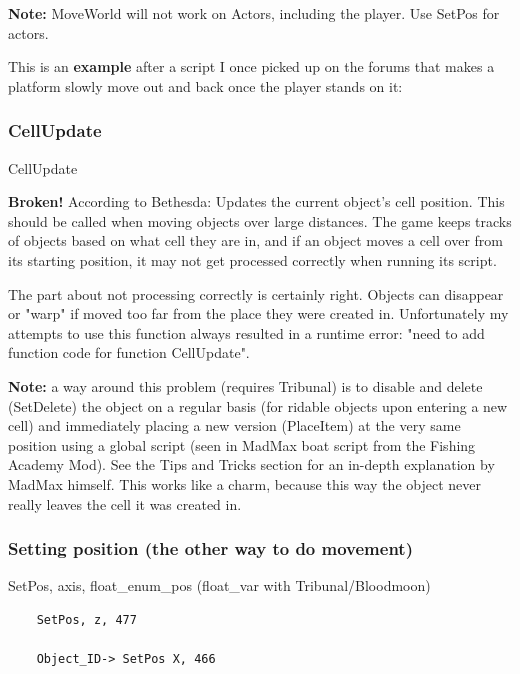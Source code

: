 \textbf{Note:} MoveWorld will not work on Actors, including the player.
Use SetPos for actors.

This is an \textbf{example} after a script I once picked up on the
forums that makes a platform slowly move out and back once the player
stands on it:



\hypertarget{cellupdate}{%
\subsubsection{CellUpdate}\label{cellupdate}}

CellUpdate

\textbf{Broken!} According to Bethesda: Updates the current object's
cell position. This should be called when moving objects over large
distances. The game keeps tracks of objects based on what cell they are
in, and if an object moves a cell over from its starting position, it
may not get processed correctly when running its script.

The part about not processing correctly is certainly right. Objects can
disappear or "warp" if moved too far from the place they were created
in. Unfortunately my attempts to use this function always resulted in a
runtime error: "need to add function code for function CellUpdate".

\textbf{Note:} a way around this problem (requires Tribunal) is to
disable and delete (SetDelete) the object on a regular basis (for
ridable objects upon entering a new cell) and immediately placing a new
version (PlaceItem) at the very same position using a global script
(seen in MadMax boat script from the Fishing Academy Mod). See the Tips
and Tricks section for an in-depth explanation by MadMax himself. This
works like a charm, because this way the object never really leaves the
cell it was created in.

\hypertarget{setting-position-the-other-way-to-do-movement}{%
\subsubsection{Setting position (the other way to do
movement)}\label{setting-position-the-other-way-to-do-movement}}

SetPos, axis, float\_enum\_pos (float\_var with Tribunal/Bloodmoon)

\begin{lstlisting}	
	SetPos, z, 477
	
	Object_ID-> SetPos X, 466
\end{lstlisting}

